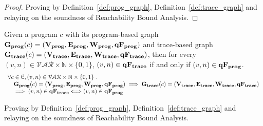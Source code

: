 \begin{proof}
Proving by Definition~\ref{def:prog_graph}, Definition~\ref{def:trace_graph} and relaying on the soundness of Reachability Bound 
Analysis.
\end{proof}
%
\begin{lem}
	\label{lem:queryvertex_map}
	Given a program $c$ with its
	program-based graph $\mathtt{\bf{G_{prog}}}({c}) = (\mathtt{\bf{V_{prog}}}, \mathtt{\bf{E_{prog}}}, \mathtt{\bf{W_{prog}}}, \mathtt{\bf{qF_{prog}}})$
	and 
	trace-based graph $\mathtt{\bf{G_{trace}}}({c}) = (\mathtt{\bf{V_{trace}}}, \mathtt{\bf{E_{trace}}}, \mathtt{\bf{W_{trace}}}, \mathtt{\bf{qF_{trace}}})$,
	then for every $(v, n) \in \mathcal{VAR} \times \mathbb{N}  \times \{0, 1\} $,
	 $(v, n) \in \mathtt{\bf{qF_{trace}}}$ if and only if $ (v, n) \in \mathtt{\bf{qF_{prog}}}$.
	\[
	\begin{array}{l}
	\forall c \in \mathcal{C} , (v, n) \in \mathcal{VAR} \times \mathbb{N}  \times \{0, 1\} 
	 ~.~ 
	 \\ \quad
	 \mathtt{\bf{G_{prog}}}({c}) = (\mathtt{\bf{V_{prog}}}, \mathtt{\bf{E_{prog}}}, \mathtt{\bf{W_{prog}}}, \mathtt{\bf{qF_{prog}}})
	\implies 
	\mathtt{\bf{G_{trace}}}({c}) = (\mathtt{\bf{V_{trace}}}, \mathtt{\bf{E_{trace}}}, \mathtt{\bf{W_{trace}}}, \mathtt{\bf{qF_{trace}}})
	\\ \quad
	\implies
	(v, n) \in \mathtt{\bf{qF_{trace}}} \Longleftrightarrow  (v, n) \in \mathtt{\bf{qF_{prog}}}
	\end{array}
	\]
	\end{lem}
\begin{subproof}
Proving by Definition~\ref{def:prog_graph}, Definition~\ref{def:trace_graph} and relaying on the soundness of Reachability Bound 
Analysis.
\end{subproof}

